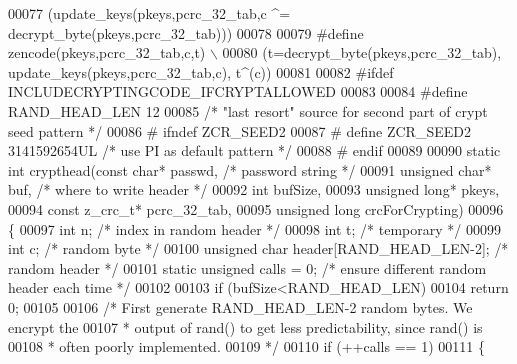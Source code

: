 \begin{DoxyCode}
00077 \textcolor{preprocessor}{    (update\_keys(pkeys,pcrc\_32\_tab,c ^= decrypt\_byte(pkeys,pcrc\_32\_tab)))}
00078 
00079 \textcolor{preprocessor}{#define zencode(pkeys,pcrc\_32\_tab,c,t) \(\backslash\)}
00080 \textcolor{preprocessor}{    (t=decrypt\_byte(pkeys,pcrc\_32\_tab), update\_keys(pkeys,pcrc\_32\_tab,c), t^(c))}
00081 
00082 \textcolor{preprocessor}{#ifdef INCLUDECRYPTINGCODE\_IFCRYPTALLOWED}
00083 
00084 \textcolor{preprocessor}{#define RAND\_HEAD\_LEN  12}
00085    \textcolor{comment}{/* "last resort" source for second part of crypt seed pattern */}
00086 \textcolor{preprocessor}{#  ifndef ZCR\_SEED2}
00087 \textcolor{preprocessor}{#    define ZCR\_SEED2 3141592654UL     }\textcolor{comment}{/* use PI as default pattern */}\textcolor{preprocessor}{}
00088 \textcolor{preprocessor}{#  endif}
00089 
00090 \textcolor{keyword}{static} \textcolor{keywordtype}{int} crypthead(\textcolor{keyword}{const} \textcolor{keywordtype}{char}* passwd,      \textcolor{comment}{/* password string */}
00091                      \textcolor{keywordtype}{unsigned} \textcolor{keywordtype}{char}* buf,      \textcolor{comment}{/* where to write header */}
00092                      \textcolor{keywordtype}{int} bufSize,
00093                      \textcolor{keywordtype}{unsigned} \textcolor{keywordtype}{long}* pkeys,
00094                      \textcolor{keyword}{const} z\_crc\_t* pcrc\_32\_tab,
00095                      \textcolor{keywordtype}{unsigned} \textcolor{keywordtype}{long} crcForCrypting)
00096 \{
00097     \textcolor{keywordtype}{int} n;                       \textcolor{comment}{/* index in random header */}
00098     \textcolor{keywordtype}{int} t;                       \textcolor{comment}{/* temporary */}
00099     \textcolor{keywordtype}{int} c;                       \textcolor{comment}{/* random byte */}
00100     \textcolor{keywordtype}{unsigned} \textcolor{keywordtype}{char} header[RAND\_HEAD\_LEN-2]; \textcolor{comment}{/* random header */}
00101     \textcolor{keyword}{static} \textcolor{keywordtype}{unsigned} calls = 0;   \textcolor{comment}{/* ensure different random header each time */}
00102 
00103     \textcolor{keywordflow}{if} (bufSize<RAND\_HEAD\_LEN)
00104       \textcolor{keywordflow}{return} 0;
00105 
00106     \textcolor{comment}{/* First generate RAND\_HEAD\_LEN-2 random bytes. We encrypt the}
00107 \textcolor{comment}{     * output of rand() to get less predictability, since rand() is}
00108 \textcolor{comment}{     * often poorly implemented.}
00109 \textcolor{comment}{     */}
00110     \textcolor{keywordflow}{if} (++calls == 1)
00111     \{

\end{DoxyCode}

